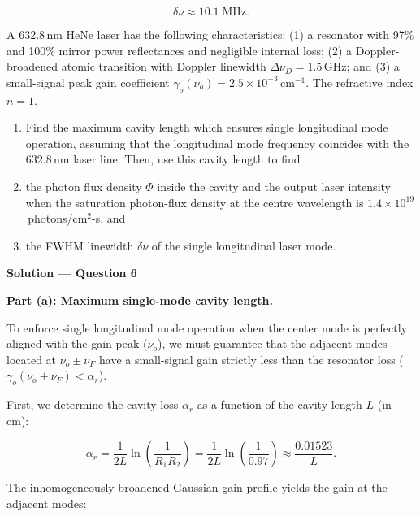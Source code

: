 \begin{equation*}
  \boxed{\delta\nu \approx 10.1\;\text{MHz}.}
\end{equation*}


\begin{question}[Question 6]A 632.8\,nm HeNe laser has the following characteristics: (1) a resonator
with 97\% and 100\% mirror power reflectances and negligible internal loss; (2) a
Doppler-broadened atomic transition with Doppler linewidth $\Delta\nu_{D}=1.5$\,GHz; and (3) a
small-signal peak gain coefficient $\gamma_{o}(\nu_{o})=2.5\times10^{-3}$\,cm$^{-1}$. The
refractive index $n=1$.
\begin{enumerate}[label=(\alph*)]
  \item Find the maximum cavity length which ensures single longitudinal mode operation,
        assuming that the longitudinal mode frequency coincides with the 632.8\,nm laser line.
        Then, use this cavity length to find
  \item the photon flux density $\Phi$ inside the cavity and the output laser intensity when
        the saturation photon-flux density at the centre wavelength is
        $1.4\times10^{19}$\,photons/cm$^{2}$-s, and
  \item the FWHM linewidth $\delta\nu$ of the single longitudinal laser mode.
\end{enumerate}
\end{question}

\textbf{\large Solution --- Question 6}

\textbf{Part (a): Maximum single-mode cavity length.}

To enforce single longitudinal mode operation when the center mode is perfectly aligned with the gain peak ($\nu_o$), we must guarantee that the adjacent modes located at $\nu_o \pm \nu_F$ have a small-signal gain strictly less than the resonator loss ($\gamma_o(\nu_o \pm \nu_F) < \alpha_r$).

First, we determine the cavity loss $\alpha_r$ as a function of the cavity length $L$ (in cm):

\begin{equation*}
  \alpha_r = \frac{1}{2L}\ln\left(\frac{1}{R_1 R_2}\right) = \frac{1}{2L}\ln\left(\frac{1}{0.97}\right) \approx \frac{0.01523}{L}.
\end{equation*}

The inhomogeneously broadened Gaussian gain profile yields the gain at the adjacent modes:

